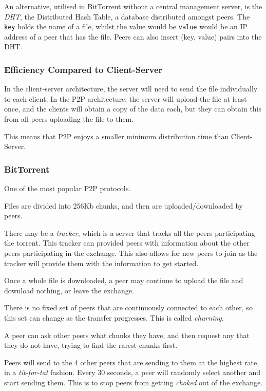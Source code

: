 \documentclass{article}
\begin{document}
An alternative, utilised in BitTorrent without a central management server, is the \textit{DHT}, the Distributed Hash Table, a database distributed amongst peers. The \texttt{key} holds the name of a file, whilst the value would be \texttt{value} would be an IP address of a peer that has the file. Peers can also insert (key, value) pairs into the DHT. 

\subsubsection{Efficiency Compared to Client-Server}

In the client-server architecture, the server will need to send the file individually to each client. In the P2P architecture, the server will upload the file at least once, and the clients will obtain a copy of the data each, but they can obtain this from all peers uploading the file to them. 

This means that P2P enjoys a smaller minimum distribution time than Client-Server.

\subsubsection{BitTorrent}

One of the most popular P2P protocols.

Files are divided into 256Kb chunks, and then are uploaded/downloaded by peers.

There may be a \textit{tracker}, which is a server that tracks all the peers participating the torrent. This tracker can provided peers with information about the other peers participating in the exchange. This also allows for new peers to join as the tracker will provide them with the information to get started.

Once a whole file is downloaded, a peer may continue to upload the file and download nothing, or leave the exchange.

There is no fixed set of peers that are continuously connected to each other, so this set can change as the transfer progresses. This is called \textit{churning}.

A peer can ask other peers what chunks they have, and then request any that they do not have, trying to find the rarest chunks first. 

Peers will send to the 4 other peers that are sending to them at the highest rate, in a \textit{tit-for-tat} fashion. Every 30 seconds, a peer will randomly select another and start sending them. This is to stop peers from getting \textit{choked} out of the exchange.
\end{document}
